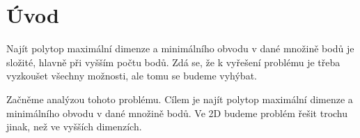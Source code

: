 \chapter*{Úvod}

Najít polytop maximální dimenze a minimálního obvodu v dané množině bodů je složité, hlavně při vyšším počtu bodů. Zdá se, že k vyřešení problému je třeba vyzkoušet všechny možnosti, ale tomu se budeme vyhýbat. 

Začněme analýzou tohoto problému. Cílem je najít polytop maximální dimenze a minimálního obvodu v dané množině bodů. Ve 2D budeme problém řešit trochu jinak, než ve vyšších dimenzích. 